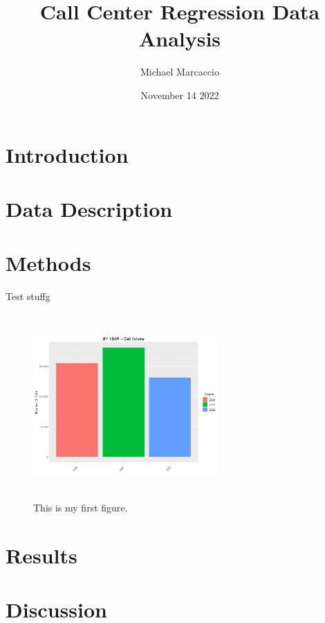 \documentclass[12pt]{article}
\title{Call Center Regression Data Analysis}
\author{Michael  Marcaccio}
\date{November 14 2022}
\begin{document}
\maketitle

\begin{abstract}
  
\end{abstract}

\section*{Introduction}


    
\section*{Data Description}



\section*{Methods}
Test stuffg
\begin{figure}[H]
    \centering
    \includegraphics[width=200pt,height=200pt]{By Year.png}
    \caption{This is my first figure.}
    \label{fig:Year}
  \end{figure}

\section*{Results}
\citep{avramidis2005modeling}
\citep{evensen1999effective}
\citep{ibrahim2016modeling}


\section*{Discussion}




\end{document}
